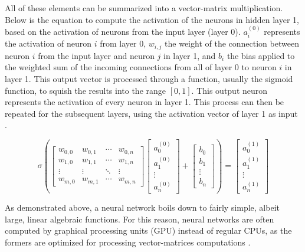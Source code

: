 \documentclass[12pt,a4paper,notitlepage]{article}
\begin{document}
All of these elements can be summarized into a vector-matrix multiplication. Below is the equation to compute the activation of the neurons in hidden layer 1, based on the activation of neurons from the input layer (layer 0). \(a_i^{(0)}\) represents the activation of neuron \(i\) from layer 0, \(w_{i,j}\) the weight of the connection between neuron \(i\) from the input layer and neuron \(j\) in layer 1, and \(b_i\) the bias applied to the weighted sum of the incoming connections from all of layer 0 to neuron \(i\) in layer 1. This output vector is processed through a function, usually the sigmoid function, to squish the results into the range \([0,1]\). This output neuron represents the activation of every neuron in layer 1. This process can then be repeated for the subsequent layers, using the activation vector of layer 1 as input \cite{sanderson_but_2017}.

\begin{displaymath}
	\sigma
	\left(
	\begin{bmatrix}
		w_{0,0} & w_{0,1} & \cdots & w_{0,n}\\
		w_{1,0} & w_{1,1} & \cdots & w_{1,n}\\
		\vdots & \vdots & \ddots & \vdots\\
		w_{m,0} & w_{m,1} & \cdots & w_{m,n}
	\end{bmatrix}
	\begin{bmatrix}
		a_{0}^{(0)}\\
		a_{1}^{(0)}\\
		\vdots\\
		a_{n}^{(0)}
	\end{bmatrix}
	+
	\begin{bmatrix}
		b_{0}\\
		b_{1}\\
		\vdots\\
		b_{n}
	\end{bmatrix}
	\right)
	=
	\begin{bmatrix}
		a_{0}^{(1)}\\
		a_{1}^{(1)}\\
		\vdots\\
		a_{n}^{(1)}
	\end{bmatrix}
\end{displaymath}

As demonstrated above, a neural network boils down to fairly simple, albeit large, linear algebraic functions. For this reason, neural networks are often computed by graphical processing units (GPU) instead of regular CPUs, as the formers are optimized for processing vector-matrices computations \cite{salter_cart_2022}.
\end{document}
